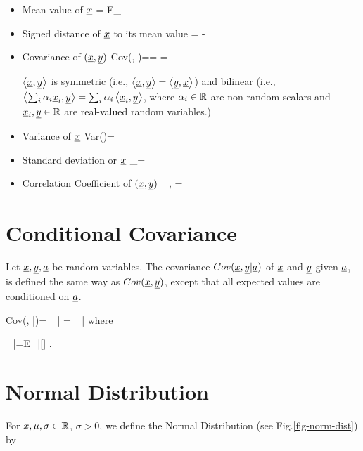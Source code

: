 \begin{itemize}
\item
Mean value of ${\underline{x}}$
\beq
\av{\rvx}=
E_\rvx[\rvx]
\eeq

\item
Signed distance of ${\underline{x}}$ to its mean value
\beq
\Delta \rvx = \rvx - \av{\rvx}
\eeq

\item
Covariance of $({\underline{x}}, {\underline{y}})$
\beq
Cov(\rvx, \rvy)=\av{\rvx, \rvy}=
\av{\Delta \rvx \Delta \rvy}
=
\av{\rvx\rvy}-\av{\rvx}\av{\rvy}
\eeq

$\left\langle{\underline{x}}, {\underline{y}}\right\rangle$ is symmetric
(i.e., $\left\langle{\underline{x}}, {\underline{y}}\right\rangle=\left\langle{\underline{y}}, {\underline{x}}\right\rangle$)
and bilinear (i.e.,
$\left\langle\sum_i \alpha_i{\underline{x}}_i, {\underline{y}}\right\rangle
=
\sum_i\alpha_i\left\langle{\underline{x}}_i, {\underline{y}}\right\rangle$, where
$\alpha_i\in { \mathbb{R}}$
are non-random scalars
and ${\underline{x}}_i, {\underline{y}}\in{ \mathbb{R}}$ are
real-valued random
variables.)

\item
Variance of ${\underline{x}}$
\beq
Var(\rvx)=\av{\rvx, \rvx}
\eeq

\item
Standard deviation or ${\underline{x}}$
\beq
\sigma_\rvx=\sqrt{\av{\rvx, \rvx}}
\eeq

\item
Correlation Coefficient of $({\underline{x}}, {\underline{y}})$
\beq
\rho_{\rvx, \rvy}=
\frac{\av{\rvx, \rvy}}
{\sqrt{\av{\rvx, \rvx}\av{\rvy, \rvy}}}
\eeq
\end{itemize}

\section{Conditional Covariance}
Let ${\underline{x}}, {\underline{y}}, {\underline{a}}$
be random variables.
The covariance $Cov({\underline{x}}, {\underline{y}}|{\underline{a}})$
of ${\underline{x}}$ and ${\underline{y}}$
given ${\underline{a}}$, is defined
the same
way as $Cov({\underline{x}}, {\underline{y}})$,
except that all
expected values are
conditioned on ${\underline{a}}$.



\beq
Cov(\rvx, \rvy|\rva)=
\av{\rvx, \rvy}_{|\rva}
=
\av{(\rvx-\av{\rvx}_{|\rva})
(\rvy-\av{\rvy}_{|\rva})}_{|\rva}
\eeq
where

\beq
\av{\rvx}_{|\rva}=E_{\rvx|\rva}[\rvx]
\;.
\eeq



\section{Normal Distribution}


For $x, \mu, \sigma\in { \mathbb{R}}$,
$\sigma >0$, we define the Normal Distribution
(see Fig.\ref{fig-norm-dist}) by

